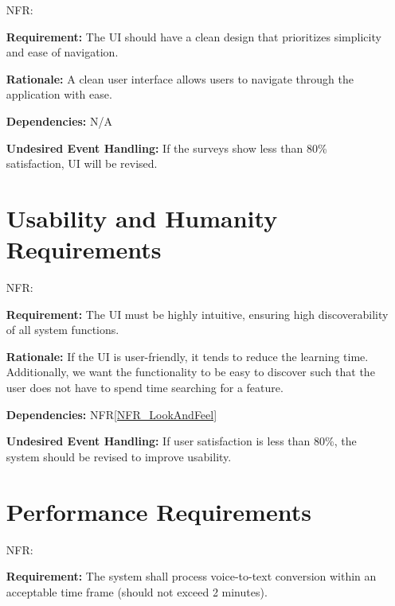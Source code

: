 \documentclass[12pt]{article}
\newcounter{nfrnum} %
\begin{document}
\noindent \begin{itemize}

\section{Look and Feel Requirements}

\item[NFR\refstepcounter{nfrnum}\thenfrnum \label{NFR_LookAndFeel}:]

\textbf{Requirement:} The UI should have a clean design that prioritizes simplicity and ease of navigation.

\textbf{Rationale:} A clean user interface allows users to navigate through the application with ease.

\textbf{Dependencies:} N/A

\textbf{Undesired Event Handling:} If the surveys show less than 80\% satisfaction, UI will be revised.

\section{Usability and Humanity Requirements}

\item[NFR\refstepcounter{nfrnum}\thenfrnum \label{NFR_Usability}:]

\textbf{Requirement:} The UI must be highly intuitive, ensuring high discoverability of all system functions.

\textbf{Rationale:} If the UI is user-friendly, it tends to reduce the learning time. Additionally, we want the functionality to be easy to discover such that the user does not have to spend time searching for a feature.

\textbf{Dependencies:} NFR\ref{NFR_LookAndFeel}

\textbf{Undesired Event Handling:} If user satisfaction is less than 80\%, the system should be revised to improve usability.

\section{Performance Requirements}

\item[NFR\refstepcounter{nfrnum}\thenfrnum \label{NFR_Performance}:]

\textbf{Requirement:} The system shall process voice-to-text conversion within an acceptable time frame (should not exceed 2 minutes).


\end{itemize}
\end{document}
